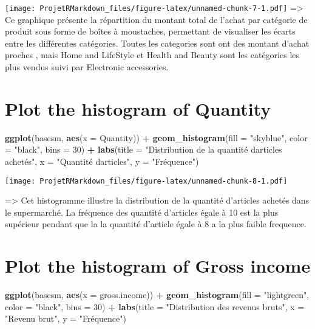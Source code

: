 \documentclass[
]{article}
\newenvironment{Shaded}{\begin{snugshade}}{\end{snugshade}}
\newcommand{\AttributeTok}[1]{\textcolor[rgb]{0.13,0.29,0.53}{#1}}
\newcommand{\DecValTok}[1]{\textcolor[rgb]{0.00,0.00,0.81}{#1}}
\newcommand{\FunctionTok}[1]{\textcolor[rgb]{0.13,0.29,0.53}{\textbf{#1}}}
\newcommand{\NormalTok}[1]{#1}
\newcommand{\SpecialCharTok}[1]{\textcolor[rgb]{0.81,0.36,0.00}{\textbf{#1}}}
\newcommand{\StringTok}[1]{\textcolor[rgb]{0.31,0.60,0.02}{#1}}
\begin{document}
\texttt{[image: ProjetRMarkdown\_files/figure-latex/unnamed-chunk-7-1.pdf]}
=\textgreater{} Ce graphique présente la répartition du montant total de
l'achat par catégorie de produit sous forme de boîtes à moustaches,
permettant de visualiser les écarts entre les différentes catégories.
Toutes les categories sont ont des montant d'achat proches , mais Home
and LifeStyle et Health and Beauty sont les catégories les plus vendus
suivi par Electronic accessories.

\hypertarget{plot-the-histogram-of-quantity}{%
\section{Plot the histogram of
Quantity}\label{plot-the-histogram-of-quantity}}

\begin{Shaded}
\begin{Highlighting}[]
\FunctionTok{ggplot}\NormalTok{(basesm, }\FunctionTok{aes}\NormalTok{(}\AttributeTok{x =}\NormalTok{ Quantity)) }\SpecialCharTok{+}
  \FunctionTok{geom\_histogram}\NormalTok{(}\AttributeTok{fill =} \StringTok{"skyblue"}\NormalTok{, }\AttributeTok{color =} \StringTok{"black"}\NormalTok{, }\AttributeTok{bins =} \DecValTok{30}\NormalTok{) }\SpecialCharTok{+}
  \FunctionTok{labs}\NormalTok{(}\AttributeTok{title =} \StringTok{"Distribution de la quantité d\textquotesingle{}articles achetés"}\NormalTok{,}
       \AttributeTok{x =} \StringTok{"Quantité d\textquotesingle{}articles"}\NormalTok{,}
       \AttributeTok{y =} \StringTok{"Fréquence"}\NormalTok{)}
\end{Highlighting}
\end{Shaded}

\texttt{[image: ProjetRMarkdown\_files/figure-latex/unnamed-chunk-8-1.pdf]}

=\textgreater{} Cet histogramme illustre la distribution de la quantité
d'articles achetés dans le supermarché. La fréquence des quantité
d'articles égale à 10 est la plus supérieur pendant que la la quantité
d'article égale à 8 a la plus faible frequence.

\hypertarget{plot-the-histogram-of-gross-income}{%
\section{Plot the histogram of Gross
income}\label{plot-the-histogram-of-gross-income}}

\begin{Shaded}
\begin{Highlighting}[]
\FunctionTok{ggplot}\NormalTok{(basesm, }\FunctionTok{aes}\NormalTok{(}\AttributeTok{x =}\NormalTok{ gross.income)) }\SpecialCharTok{+}
  \FunctionTok{geom\_histogram}\NormalTok{(}\AttributeTok{fill =} \StringTok{"lightgreen"}\NormalTok{, }\AttributeTok{color =} \StringTok{"black"}\NormalTok{, }\AttributeTok{bins =} \DecValTok{30}\NormalTok{) }\SpecialCharTok{+}
  \FunctionTok{labs}\NormalTok{(}\AttributeTok{title =} \StringTok{"Distribution des revenus bruts"}\NormalTok{,}
       \AttributeTok{x =} \StringTok{"Revenu brut"}\NormalTok{,}
       \AttributeTok{y =} \StringTok{"Fréquence"}\NormalTok{)}
\end{Highlighting}
\end{Shaded}
\end{document}
